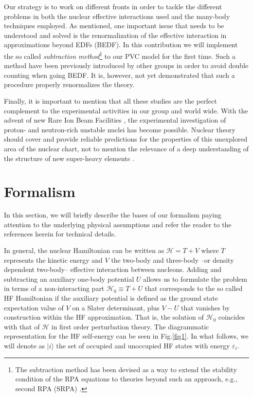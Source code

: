 \documentclass[12pt,a4paper,final]{iopart}
\begin{document}
Our strategy is to work on different fronts in order to tackle the different problems in both the nuclear effective interactions used and the many-body techniques employed. As mentioned, one important issue that needs to be understood and solved is the renormalization of the effective interaction in approximations beyond EDFs (BEDF). In this contribution we will implement the so called {\it subtraction method}\footnote{The subtraction method has been devised as a way to extend the stability condition of the RPA equations to theories beyond such an approach, e.g., second RPA (SRPA) \cite{rowe}.} \cite{tselyaev2007, tselyaev2013} to our PVC model for the first time. Such a method have been previously introduced by other groups \cite{litvinova2007, gambacurta2015, lyutorovich2015,lyutorovich2016} in order to avoid double counting when going BEDF. It is, however, not yet demonstrated that such a procedure properly renormalizes the theory. 


Finally, it is important to mention that all these studies are the perfect complement to the experimental activities in our group \cite{carbone10,bocchi2016} and world wide. With the advent of new Rare Ion Beam Facilities \cite{blumenfeld2013}, the experimental investigation of proton- and neutron-rich unstable nuclei has become possible. Nuclear theory should cover and provide reliable predictions for the properties of this unexplored area of the nuclear chart, not to mention the relevance of a deep understanding of the structure of new super-heavy elements \cite{litvinova2011, oganessian2015}. 

\section{Formalism}
\label{method}

In this section, we will briefly describe the bases of our formalism paying attention to the underlying physical assumptions and refer the reader to the references herein for technical details.

In general, the nuclear Hamiltonian can be written as $\mathcal{H} = T + V$ where $T$ represents the kinetic energy and $V$ the two-body and three-body --or density dependent two-body-- effective interaction between nucleons. Adding and subtracting an auxiliary one-body potential $U$ allows us to formulate the problem in terms of a non-interacting part $\mathcal{H}_0\equiv T + U$ that corresponds to the so called HF Hamiltonian if the auxiliary potential is defined as the ground state expectation value of $V$ on a Slater determinant, plus $V-U$ that vanishes by construction within the HF approximation. That is, the solution of $\mathcal{H}_0$ coincides with that of $\mathcal{H}$ in first order perturbation theory. The diagrammatic representation for the HF self-energy can be seen in Fig.\ref{fig1}. In what follows, we will denote as $\vert i\rangle$ the set of occupied and unoccupied HF states with energy $\varepsilon_i$. 
\end{document}
